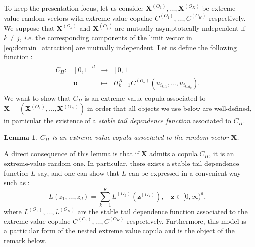\documentclass[11pt]{article}
\newtheorem{lemma}{Lemma}
\begin{document}
	To keep the presentation focus, let us consider $\textbf{X}^{(O_1)}, \dots, \textbf{X}^{(O_K)}$ be extreme value random vectors with extreme value copulae $C^{(O_1)}, \dots, C^{(O_K)}$ respectively. We suppose that $\textbf{X}^{(O_k)}$ and $\textbf{X}^{(O_j)}$ are mutually asymptotically independent if $k \neq j$, \emph{i.e.} the corresponding components of the limit vector in \eqref{eq:domain_attraction} are mutually independent. Let us define the following function :
	\begin{align*}
		\begin{array}{lrcl}
C_\Pi : & [0,1]^d & \longrightarrow & [0,1] \\
    & \textbf{u} & \longmapsto & \Pi_{k=1}^K C^{(O_k)}(u_{i_{k,1}}, \dots, u_{i_{k,d_k}}). \end{array}
	\end{align*}
	We want to show that $C_\Pi$ is an extreme value copula associated to $\textbf{X} = (\textbf{X}^{(O_1)}, \dots, \textbf{X}^{(O_K)})$ in order that all objects we use below are well-defined, in particular the existence of a \emph{stable tail dependence function} associated to $C_\Pi$.
	\begin{lemma}
		\label{lem:Cevt}
		$C_\Pi$ is an extreme value copula associated to the random vector $\textbf{X}$.
	\end{lemma}
	
	A direct consequence of this lemma is that if $\textbf{X}$ admits a copula $C_\Pi$, it is an extreme-value random one. In particular, there exists a stable tail dependence function $L$ say, and one can show that $L$ can be expressed in a convenient way such as :
	\begin{equation}
		\label{eq:mutual_indep_stdf}
		L\left(z_1, \dots, z_d\right) = \sum_{k=1}^K L^{(O_k)}\left( \textbf{z}^{(O_k)} \right), \quad \textbf{z} \in [0,\infty)^d,
	\end{equation}
	where $L^{(O_1)}, \dots, L^{(O_K)}$ are the stable tail dependence function associated to the extreme value copulae $C^{(O_1)}, \dots, C^{(O_K)}$ respectively. Furthermore, this model is a particular form of the nested extreme value copula and is the object of the remark below.
	
\end{document}
